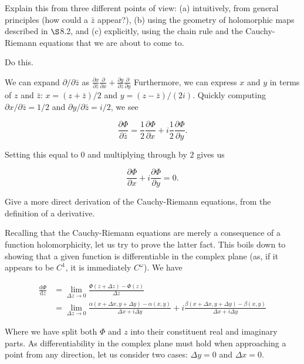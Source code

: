 \documentclass[../the-road-to-reality.tex]{subfiles}
\begin{document}
\begin{questions}
\question Explain this from three different points of view: (a) intuitively, from general principles (how could a $\bar{z}$ appear?), (b) using the geometry of holomorphic maps described in $\S$8.2, and (c) explicitly, using the chain rule and the Cauchy-Riemann equations that we are about to come to.

\question Do this.

\begin{solution}
	We can expand $\partial/\partial\bar{z}$ as $\frac{\partial{x}}{\partial\bar{z}}\frac{\partial}{\partial{x}} + \frac{\partial{y}}{\partial\bar{z}}\frac{\partial}{\partial{y}}$ Furthermore, we can express $x$ and $y$ in terms of $z$ and $\bar{z}$: $x = (z + \bar{z})/2$ and $y = (z - \bar{z})/(2i)$. Quickly computing $\partial{x}/\partial\bar{z} = 1/2$ and $\partial{y}/\partial\bar{z} = i/2$, we see
	
\[
	\frac{\partial\Phi}{\partial\bar{z}} = \frac{1}{2}\frac{\partial\Phi}{\partial{x}} + i\frac{1}{2}\frac{\partial\Phi}{\partial{y}}
.\] 	

	Setting this equal to $0$ and multiplying through by $2$ gives us
	
	\[
	\frac{\partial\Phi}{\partial{x}} + i\frac{\partial\Phi}{\partial{y}} = 0
	.\] 
\end{solution}

\question Give a more direct derivation of the Cauchy-Riemann equations, from the definition of a derivative.

\begin{solution}
        Recalling that the Cauchy-Riemann equations are merely a consequence of a function holomorphicity, let us try to prove the latter fact. This boils down to showing that a given function is differentiable in the complex plane (as, if it appears to be $C^1$, it is immediately $C^\omega$). We have

        \begin{align*}
                \frac{\mathrm{d}\Phi}{\mathrm{d}z} &= \lim_{\Delta{z}\to{0}}\frac{\Phi(z + \Delta{z}) - \Phi(z)}{\Delta{z}} \\
                &= \lim_{\Delta{z}\to{0}}\frac{\alpha(x + \Delta{x}, y + \Delta{y}) - \alpha(x, y)}{\Delta{x} + i\Delta{y}} + i\frac{\beta(x + \Delta{x}, y + \Delta{y}) - \beta(x, y)}{\Delta{x} + i\Delta{y}}
        \end{align*}

        Where we have split both $\Phi$ and $z$ into their constituent real and imaginary parts. As differentiability in the complex plane must hold when approaching a point from any direction, let us consider two cases: $\Delta{y} = 0$ and $\Delta{x} = 0$.


\end{solution}
\end{questions}
\end{document}
